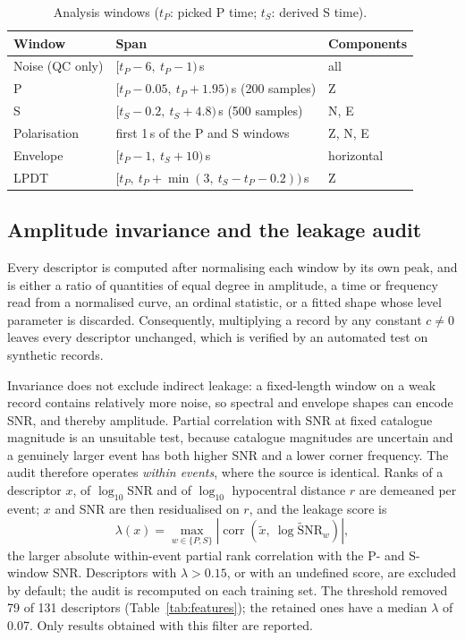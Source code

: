 \documentclass[11pt,a4paper]{article}
\begin{document}
\begin{table}[ht]
  \centering\small
  \caption{Analysis windows ($t_P$: picked P time; $t_S$: derived S time).}
  \label{tab:windows}
  \begin{tabular}{lll}
    \toprule
    Window & Span & Components \\
    \midrule
    Noise (QC only) & $[t_P-6,\ t_P-1)$\,s & all \\
    P & $[t_P-0.05,\ t_P+1.95)$\,s (200 samples) & Z \\
    S & $[t_S-0.2,\ t_S+4.8)$\,s (500 samples) & N, E \\
    Polarisation & first 1\,s of the P and S windows & Z, N, E \\
    Envelope & $[t_P-1,\ t_S+10)$\,s & horizontal \\
    LPDT & $[t_P,\ t_P+\min(3,\ t_S-t_P-0.2))$\,s & Z \\
    \bottomrule
  \end{tabular}
\end{table}

\subsection{Amplitude invariance and the leakage audit}
\label{sec:invariance}
Every descriptor is computed after normalising each window by its own
peak, and is either a ratio of quantities of equal degree in amplitude, a time
or frequency read from a normalised curve, an ordinal statistic, or a fitted
shape whose level parameter is discarded. Consequently, multiplying a record
by any constant $c \neq 0$ leaves every descriptor unchanged, which is verified
by an automated test on synthetic records.

Invariance does not exclude indirect leakage: a fixed-length window on a weak
record contains relatively more noise, so spectral and envelope shapes can
encode SNR, and thereby amplitude. Partial correlation with SNR at fixed
catalogue magnitude is an unsuitable test, because catalogue magnitudes are
uncertain and a genuinely larger event has both higher SNR and a lower corner
frequency. The audit therefore operates \emph{within events}, where the source
is identical. Ranks of a descriptor $x$, of $\log_{10}$SNR and of
$\log_{10}$ hypocentral distance $r$ are demeaned per event; $x$ and SNR are then
residualised on $r$, and the leakage score is
\begin{equation}
  \lambda(x) = \max_{w\in\{P,S\}} \left| \operatorname{corr}\!\left(\tilde x,\ \widetilde{\log \mathrm{SNR}_w}\right) \right| ,
\end{equation}
the larger absolute within-event partial rank correlation with the P- and
S-window SNR. Descriptors with $\lambda > 0.15$, or with an undefined score, are
excluded by default; the audit is recomputed on each training set. The
threshold removed 79 of 131 descriptors (Table~\ref{tab:features}); the
retained ones have a median $\lambda$ of 0.07. Only results obtained with this
filter are reported.
\end{document}
